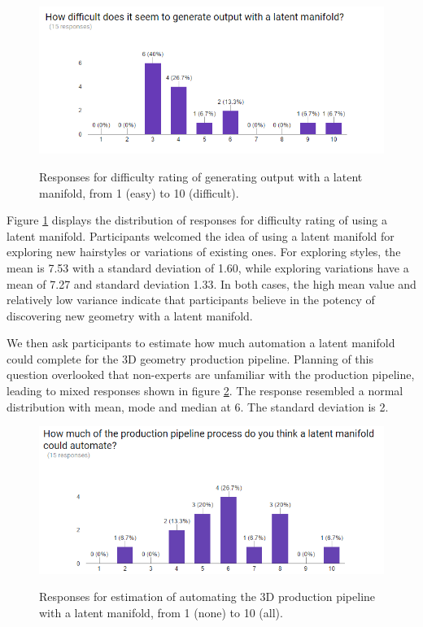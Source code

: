\documentclass[ %
author={Dillon Keith Diep},
supervisor={Dr. Carl Henrik Ek},
degree={MEng},
title={ART-CG Hair:},
subtitle={Assisted Real-time Content Generation of Stylised Virtual Hair},
type={Research},
year={2017} ]{dissertation}
\begin{document}
\begin{figure}[!h]
	\centering
	\caption{Responses for difficulty rating of generating output with a latent manifold, from 1 (easy) to 10 (difficult).}
	\includegraphics[scale=0.7]{images/surveyDifficulty}
	\label{fig:surveyDifficulty}
\end{figure}

Figure \ref{fig:surveyDifficulty} displays the distribution of responses for difficulty rating of using a latent manifold.
Participants welcomed the idea of using a latent manifold for exploring new hairstyles or variations of existing ones. For exploring styles, the mean is 7.53 with a standard deviation of 1.60, while exploring variations have a mean of 7.27 and standard deviation 1.33. In both cases, the high mean value and relatively low variance indicate that participants believe in the potency of discovering new geometry with a latent manifold.

We then ask participants to estimate how much automation a latent manifold could complete for the 3D geometry production pipeline. Planning of this question overlooked that non-experts are unfamiliar with the production pipeline, leading to mixed responses shown in figure \ref{surveyAutomate}. The response resembled a normal distribution with mean, mode and median at 6. The standard deviation is 2.
\begin{figure}[!h]
	\centering
	\caption{Responses for estimation of automating the 3D production pipeline with a latent manifold, from 1 (none) to 10 (all).}
	\includegraphics[scale=0.7]{images/surveyAutomate}
	\label{surveyAutomate}
\end{figure}
\end{document}
